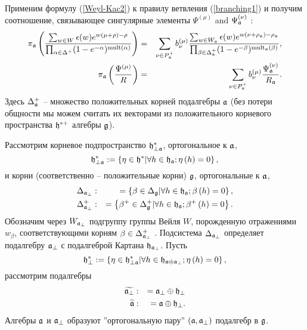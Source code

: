 Применим формулу  (\ref{Weyl-Kac2}) к правилу ветвления (\ref{branching1}) и получим соотношение, связывающее сингулярные элементы
 $\Psi ^{\left( \mu \right) }$ and $\Psi _{ \mathfrak{a}}^{\left( \nu \right) }$ :
\begin{eqnarray}
\nonumber
\pi _{\af}\left( \frac{\sum_{w \in W}\epsilon (w )e^{w
(\mu +\rho )-\rho }}{\prod_{\alpha \in \Delta ^{+}}(1-e^{-\alpha })^{\mathrm{%
mult}(\alpha )}}\right) &=&\sum_{\nu \in P_{\af}^{+}}b_{\nu }^{(\mu )}%
\frac{\sum_{w \in W_{\af}}\epsilon (w )e^{w (\nu +\rho _{%
\af})-\rho _{\af}}}{\prod_{\beta \in \Delta _{\af%
}^{+}}(1-e^{-\beta })^{\mathrm{mult}_{\af}(\beta )}},  \label{eq:124} \\
\pi _{\af}\left( \frac{\Psi ^{\left( \mu \right) }}{R}\right)
&=&\sum_{\nu \in P_{\af}^{+}}b_{\nu }^{(\mu )}\frac{\Psi _{ \frak{%
a}}^{\left( \nu \right) }}{R_{\af}}.
\end{eqnarray}
Здесь $\Delta _{\mathfrak{a}}^{+}$ -- множество положительных корней подалгебры $\mathfrak{a}$ (без потери общности мы можем считать их векторами из положительного корневого пространства  $\mathfrak{h}^{\ast  +}$ алгебры $\mathfrak{g}$).

Рассмотрим корневое подпространство $\mathfrak{h}_{\perp \mathfrak{a}}^{\ast }$, ортогональное к  $\mathfrak{a}$,
\begin{equation*}
\mathfrak{h}_{\perp \mathfrak{a}}^{\ast }:=\left\{ \eta \in \mathfrak{h}^{\ast }
|\forall h \in \mathfrak{h}_{\mathfrak{a}};  \eta\left(h \right)=0 \right\} ,
\end{equation*}
и корни (соответственно -- положительные корни)  $\mathfrak{g}$, ортогональные
к $\mathfrak{a}$,
\begin{eqnarray*}
\Delta _{\af_{\perp }} &:&=\left\{ \beta \in \Delta _{\gf}|
\forall h \in \hf_{\af};  \beta\left(h \right)=0  \right\} , \\
\Delta _{\af_{\perp }}^{+} &:&=\left\{ \beta ^{+}\in \Delta _{\gf%
}^{+}|\forall h \in \hf_{\af};  \beta^{+}\left(h \right)=0  \right\} .
\end{eqnarray*}
Обозначим через $W_{\mathfrak{a}_{\perp}}$ подгруппу группы Вейля $W$, порожденную отражениями $w _{\beta }$, соответствующими корням $\beta \in \Delta _{\mathfrak{a}_{\perp}}^{+}$ . Подсистема  $\Delta _{\mathfrak{a}_{\perp }}$ определяет подалгебру $\mathfrak{a}_{\perp }$ с подалгеброй Картана $\mathfrak{h}_{\mathfrak{a}_{\perp}}$. Пусть
\begin{equation*}
\mathfrak{h}_{\perp }^{\ast }:=\left\{ \eta \in \mathfrak{h}_{\perp \mathfrak{a}}^{\ast
}|\forall h \in \mathfrak{h}_{\mathfrak{a}\oplus \mathfrak{a}_{\perp}}; \eta \left( h \right)=0 \right\},
\end{equation*}
рассмотрим подалгебры
\begin{eqnarray*}
\widetilde{\mathfrak{a}_{\perp }} &:&=\mathfrak{a}_{\perp }\oplus \mathfrak{h}_{\perp }
\\
\widetilde{\mathfrak{a}} &:&=\mathfrak{a}\oplus \mathfrak{h}_{\perp }.
\end{eqnarray*}
Алгебры $\mathfrak{a}$ и $\mathfrak{a}_{\perp }$ образуют ''ортогональную пару''
$\left( \mathfrak{a},\mathfrak{a}_{\perp}\right)$ подалгебр в  $\mathfrak{g}$.

